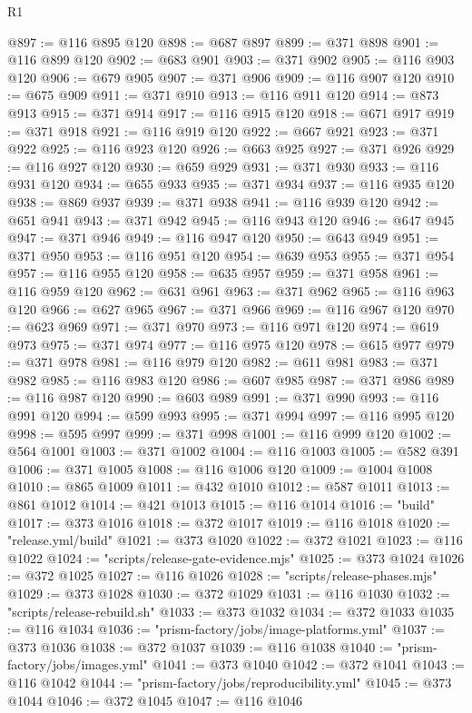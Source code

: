 \begin{lexlean}{R1}
\begin{coremodule}
@897 := @116 @895 @120
@898 := @687 @897
@899 := @371 @898
@901 := @116 @899 @120
@902 := @683 @901
@903 := @371 @902
@905 := @116 @903 @120
@906 := @679 @905
@907 := @371 @906
@909 := @116 @907 @120
@910 := @675 @909
@911 := @371 @910
@913 := @116 @911 @120
@914 := @873 @913
@915 := @371 @914
@917 := @116 @915 @120
@918 := @671 @917
@919 := @371 @918
@921 := @116 @919 @120
@922 := @667 @921
@923 := @371 @922
@925 := @116 @923 @120
@926 := @663 @925
@927 := @371 @926
@929 := @116 @927 @120
@930 := @659 @929
@931 := @371 @930
@933 := @116 @931 @120
@934 := @655 @933
@935 := @371 @934
@937 := @116 @935 @120
@938 := @869 @937
@939 := @371 @938
@941 := @116 @939 @120
@942 := @651 @941
@943 := @371 @942
@945 := @116 @943 @120
@946 := @647 @945
@947 := @371 @946
@949 := @116 @947 @120
@950 := @643 @949
@951 := @371 @950
@953 := @116 @951 @120
@954 := @639 @953
@955 := @371 @954
@957 := @116 @955 @120
@958 := @635 @957
@959 := @371 @958
@961 := @116 @959 @120
@962 := @631 @961
@963 := @371 @962
@965 := @116 @963 @120
@966 := @627 @965
@967 := @371 @966
@969 := @116 @967 @120
@970 := @623 @969
@971 := @371 @970
@973 := @116 @971 @120
@974 := @619 @973
@975 := @371 @974
@977 := @116 @975 @120
@978 := @615 @977
@979 := @371 @978
@981 := @116 @979 @120
@982 := @611 @981
@983 := @371 @982
@985 := @116 @983 @120
@986 := @607 @985
@987 := @371 @986
@989 := @116 @987 @120
@990 := @603 @989
@991 := @371 @990
@993 := @116 @991 @120
@994 := @599 @993
@995 := @371 @994
@997 := @116 @995 @120
@998 := @595 @997
@999 := @371 @998
@1001 := @116 @999 @120
@1002 := @564 @1001
@1003 := @371 @1002
@1004 := @116 @1003
@1005 := @582 @391
@1006 := @371 @1005
@1008 := @116 @1006 @120
@1009 := @1004 @1008
@1010 := @865 @1009
@1011 := @432 @1010
@1012 := @587 @1011
@1013 := @861 @1012
@1014 := @421 @1013
@1015 := @116 @1014
@1016 := "build"
@1017 := @373 @1016
@1018 := @372 @1017
@1019 := @116 @1018
@1020 := "release.yml/build"
@1021 := @373 @1020
@1022 := @372 @1021
@1023 := @116 @1022
@1024 := "scripts/release-gate-evidence.mjs"
@1025 := @373 @1024
@1026 := @372 @1025
@1027 := @116 @1026
@1028 := "scripts/release-phases.mjs"
@1029 := @373 @1028
@1030 := @372 @1029
@1031 := @116 @1030
@1032 := "scripts/release-rebuild.sh"
@1033 := @373 @1032
@1034 := @372 @1033
@1035 := @116 @1034
@1036 := "prism-factory/jobs/image-platforms.yml"
@1037 := @373 @1036
@1038 := @372 @1037
@1039 := @116 @1038
@1040 := "prism-factory/jobs/images.yml"
@1041 := @373 @1040
@1042 := @372 @1041
@1043 := @116 @1042
@1044 := "prism-factory/jobs/reproducibility.yml"
@1045 := @373 @1044
@1046 := @372 @1045
@1047 := @116 @1046

\end{coremodule}
\end{lexlean}
